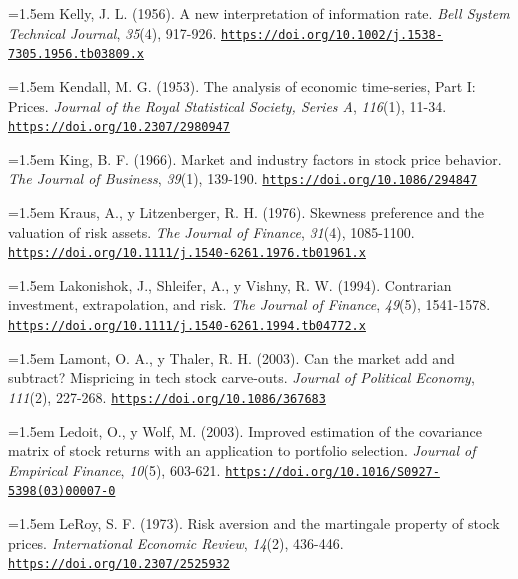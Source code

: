 \documentclass[10pt,a4paper]{article}
\begin{document}
\noindent\hangindent=1.5em Kelly, J. L. (1956). A new interpretation of information rate. \textit{Bell System Technical Journal}, \textit{35}(4), 917-926. \href{https://doi.org/10.1002/j.1538-7305.1956.tb03809.x}{\nolinkurl{https://doi.org/10.1002/j.1538-7305.1956.tb03809.x}}

\noindent\hangindent=1.5em Kendall, M. G. (1953). The analysis of economic time-series, Part I: Prices. \textit{Journal of the Royal Statistical Society, Series A}, \textit{116}(1), 11-34. \href{https://doi.org/10.2307/2980947}{\nolinkurl{https://doi.org/10.2307/2980947}}

\noindent\hangindent=1.5em King, B. F. (1966). Market and industry factors in stock price behavior. \textit{The Journal of Business}, \textit{39}(1), 139-190. \href{https://doi.org/10.1086/294847}{\nolinkurl{https://doi.org/10.1086/294847}}

\noindent\hangindent=1.5em Kraus, A., y Litzenberger, R. H. (1976). Skewness preference and the valuation of risk assets. \textit{The Journal of Finance}, \textit{31}(4), 1085-1100. \href{https://doi.org/10.1111/j.1540-6261.1976.tb01961.x}{\nolinkurl{https://doi.org/10.1111/j.1540-6261.1976.tb01961.x}}

\noindent\hangindent=1.5em Lakonishok, J., Shleifer, A., y Vishny, R. W. (1994). Contrarian investment, extrapolation, and risk. \textit{The Journal of Finance}, \textit{49}(5), 1541-1578. \href{https://doi.org/10.1111/j.1540-6261.1994.tb04772.x}{\nolinkurl{https://doi.org/10.1111/j.1540-6261.1994.tb04772.x}}

\noindent\hangindent=1.5em Lamont, O. A., y Thaler, R. H. (2003). Can the market add and subtract? Mispricing in tech stock carve-outs. \textit{Journal of Political Economy}, \textit{111}(2), 227-268. \href{https://doi.org/10.1086/367683}{\nolinkurl{https://doi.org/10.1086/367683}}

\noindent\hangindent=1.5em Ledoit, O., y Wolf, M. (2003). Improved estimation of the covariance matrix of stock returns with an application to portfolio selection. \textit{Journal of Empirical Finance}, \textit{10}(5), 603-621. \href{https://doi.org/10.1016/S0927-5398(03)00007-0}{\nolinkurl{https://doi.org/10.1016/S0927-5398(03)00007-0}}

\noindent\hangindent=1.5em LeRoy, S. F. (1973). Risk aversion and the martingale property of stock prices. \textit{International Economic Review}, \textit{14}(2), 436-446. \href{https://doi.org/10.2307/2525932}{\nolinkurl{https://doi.org/10.2307/2525932}}
\end{document}
